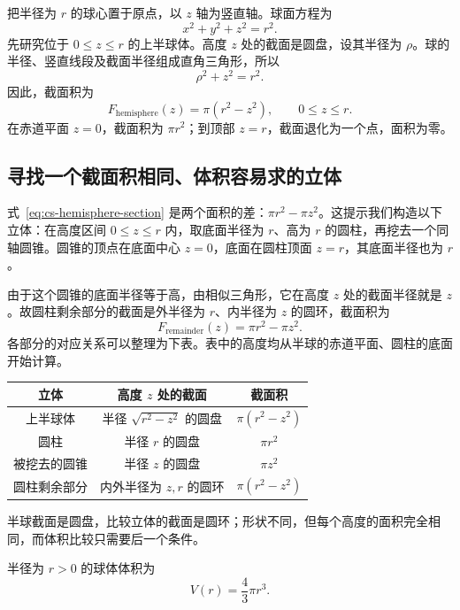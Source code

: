 \documentclass[UTF8]{ctexart}
\begin{document}
把半径为 $r$ 的球心置于原点，以 $z$ 轴为竖直轴。球面方程为
\[
  x^2+y^2+z^2=r^2.
\]
先研究位于 $0\leq z\leq r$ 的上半球体。高度 $z$ 处的截面是圆盘，设其半径为 $\rho$。球的半径、竖直线段及截面半径组成直角三角形，所以
\[
  \rho^2+z^2=r^2.
\]
因此，截面积为
\begin{equation}\label{eq:cs-hemisphere-section}
  F_{\mathrm{hemisphere}}(z)=\pi(r^2-z^2),
  \qquad 0\leq z\leq r.
\end{equation}
在赤道平面 $z=0$，截面积为 $\pi r^2$；到顶部 $z=r$，截面退化为一个点，面积为零。

\subsection{寻找一个截面积相同、体积容易求的立体}

式~\eqref{eq:cs-hemisphere-section} 是两个面积的差：$\pi r^2-\pi z^2$。这提示我们构造以下立体：在高度区间 $0\leq z\leq r$ 内，取底面半径为 $r$、高为 $r$ 的圆柱，再挖去一个同轴圆锥。圆锥的顶点在底面中心 $z=0$，底面在圆柱顶面 $z=r$，其底面半径也为 $r$。

由于这个圆锥的底面半径等于高，由相似三角形，它在高度 $z$ 处的截面半径就是 $z$。故圆柱剩余部分的截面是外半径为 $r$、内半径为 $z$ 的圆环，截面积为
\[
  F_{\mathrm{remainder}}(z)=\pi r^2-\pi z^2.
\]
各部分的对应关系可以整理为下表。表中的高度均从半球的赤道平面、圆柱的底面开始计算。
\begin{center}
\begin{tabular}{c c c}
\toprule
立体 & 高度 $z$ 处的截面 & 截面积 \\
\midrule
上半球体 & 半径 $\sqrt{r^2-z^2}$ 的圆盘 & $\pi(r^2-z^2)$ \\
圆柱 & 半径 $r$ 的圆盘 & $\pi r^2$ \\
被挖去的圆锥 & 半径 $z$ 的圆盘 & $\pi z^2$ \\
圆柱剩余部分 & 内外半径为 $z,r$ 的圆环 & $\pi(r^2-z^2)$ \\
\bottomrule
\end{tabular}
\end{center}
半球截面是圆盘，比较立体的截面是圆环；形状不同，但每个高度的面积完全相同，而体积比较只需要后一个条件。

\begin{theorem}[球体积]
半径为 $r>0$ 的球体体积为
\begin{equation}\label{eq:cs-sphere-volume}
  \boxed{V(r)=\frac43\pi r^3}.
\end{equation}
\end{theorem}
\end{document}
